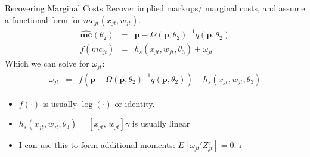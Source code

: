 \documentclass[xcolor=pdftex,dvipsnames,table,mathserif,aspectratio=169]{beamer}
\begin{document}
\begin{frame}{Recovering Marginal Costs }
Recover implied markups/ marginal costs, and assume a functional form for $mc_{jt}(x_{jt},w_{jt})$.
\begin{eqnarray*}
\widehat{\mathbf{mc}}(\theta_2)&=& \mathbf{p}- \Omega(\mathbf{p},\theta_2)^{-1} q(\mathbf{p},\theta_2)\\
f(mc_{jt}) &=& h_s(x_{jt} , w_{jt},\theta_3)+ \omega_{jt}
\end{eqnarray*}
Which we can solve for $\omega_{jt}$:
\begin{eqnarray*}
\omega_{jt} &=&  f(\mathbf{p}- \Omega(\mathbf{p},\theta_2)^{-1} q(\mathbf{p},\theta_2)) - h_s(x_{jt},w_{jt},\theta_3)
\end{eqnarray*}
\begin{itemize}
\item $f(\cdot)$ is usually $\log(\cdot)$ or identity.
\item $h_s(x_{jt},w_{jt},\theta_3) = [x_{jt}, \, w_{jt}] \gamma$ is usually linear
\item I can use this to form additional moments: $E[\omega_{jt}' Z_{jt}^{s}]=0$.
\i%
\end{itemize}
\end{frame}
\end{document}

